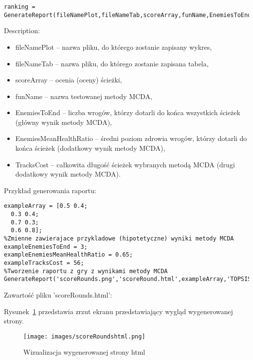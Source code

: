 \begin{lstlisting}[style=Matlab-editor]
ranking = GenerateReport(fileNamePlot,fileNameTab,scoreArray,funName,EnemiesToEnd,EnemiesMeanHealthRatio,TracksCost);
\end{lstlisting}

Description:
\begin{itemize}
\item fileNamePlot -- nazwa pliku, do którego zostanie zapisany wykres,
\item fileNameTab -- nazwa pliku, do którego zostanie zapisana tabela,
\item scoreArray -- ocenia (oceny) ścieżki,
\item funName -- nazwa testowanej metody MCDA,
\item EnemiesToEnd -- liczba wrogów, którzy dotarli do końca wszystkich ścieżek (główny wynik metody MCDA),
\item EnemiesMeanHealthRatio -- średni poziom zdrowia wrogów, którzy dotarli do końca ścieżek (dodatkowy wynik metody MCDA),
\item TracksCost -- całkowita długość ścieżek wybranych metodą MCDA (drugi dodatkowy wynik metody MCDA).
\end{itemize}

Przykład generowania raportu:
\begin{lstlisting}[style=Matlab-editor]
%Tablica zawierajaca przykladowe (hipotetyczne) wyniki wyboru sciezki metoda MCDA w grze skladajacej sie z czterech rund z dwiema sciezkami do wyboru
exampleArray = [0.5 0.4;
  0.3 0.4;
  0.7 0.3;
  0.6 0.8];
%Zmienne zawierajace przykladowe (hipotetyczne) wyniki metody MCDA
exampleEnemiesToEnd = 3;
exampleEnemiesMeanHealthRatio = 0.65;
exampleTracksCost = 56;
%Tworzenie raportu z gry z wynikami metody MCDA
GenerateReport('scoreRounds.png','scoreRound.html',exampleArray,'TOPSIS',exampleEnemiesToEnd,exampleEnemiesMeanHealthRatio,exampleTracksCost);
\end{lstlisting}

Zawartość pliku 'scoreRounds.html':


Rysunek~\ref{Fig:scoreRoundshtml} przedstawia zrzut ekranu przedstawiający wygląd wygenerowanej strony.

\begin{figure}
\texttt{[image: images/scoreRoundshtml.png]}
\caption{Wizualizacja wygenerowanej strony html}
\label{Fig:scoreRoundshtml}
\end{figure} 

